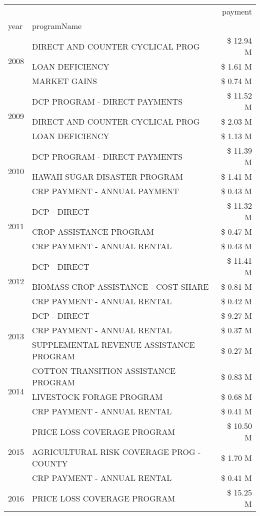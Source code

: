 \begin{tabular}{llr}
\toprule
 &  & payment \\
year & programName &  \\
\midrule
\multirow[t]{3}{*}{2008} & DIRECT AND COUNTER CYCLICAL PROG & \$ 12.94 M \\
 & LOAN DEFICIENCY & \$ 1.61 M \\
 & MARKET GAINS & \$ 0.74 M \\
\cline{1-3}
\multirow[t]{3}{*}{2009} & DCP PROGRAM - DIRECT PAYMENTS & \$ 11.52 M \\
 & DIRECT AND COUNTER CYCLICAL PROG & \$ 2.03 M \\
 & LOAN DEFICIENCY & \$ 1.13 M \\
\cline{1-3}
\multirow[t]{3}{*}{2010} & DCP PROGRAM - DIRECT PAYMENTS & \$ 11.39 M \\
 & HAWAII SUGAR DISASTER PROGRAM & \$ 1.41 M \\
 & CRP PAYMENT - ANNUAL PAYMENT & \$ 0.43 M \\
\cline{1-3}
\multirow[t]{3}{*}{2011} & DCP - DIRECT & \$ 11.32 M \\
 & CROP ASSISTANCE PROGRAM & \$ 0.47 M \\
 & CRP PAYMENT - ANNUAL RENTAL & \$ 0.43 M \\
\cline{1-3}
\multirow[t]{3}{*}{2012} & DCP - DIRECT & \$ 11.41 M \\
 & BIOMASS CROP ASSISTANCE - COST-SHARE & \$ 0.81 M \\
 & CRP PAYMENT - ANNUAL RENTAL & \$ 0.42 M \\
\cline{1-3}
\multirow[t]{3}{*}{2013} & DCP - DIRECT & \$ 9.27 M \\
 & CRP PAYMENT - ANNUAL RENTAL & \$ 0.37 M \\
 & SUPPLEMENTAL REVENUE ASSISTANCE PROGRAM & \$ 0.27 M \\
\cline{1-3}
\multirow[t]{3}{*}{2014} & COTTON TRANSITION ASSISTANCE PROGRAM & \$ 0.83 M \\
 & LIVESTOCK FORAGE PROGRAM & \$ 0.68 M \\
 & CRP PAYMENT - ANNUAL RENTAL & \$ 0.41 M \\
\cline{1-3}
\multirow[t]{3}{*}{2015} & PRICE LOSS COVERAGE PROGRAM & \$ 10.50 M \\
 & AGRICULTURAL RISK COVERAGE PROG - COUNTY & \$ 1.70 M \\
 & CRP PAYMENT - ANNUAL RENTAL & \$ 0.41 M \\
\cline{1-3}
\multirow[t]{3}{*}{2016} & PRICE LOSS COVERAGE PROGRAM                   & \$ 15.25 M \\

\end{tabular}
